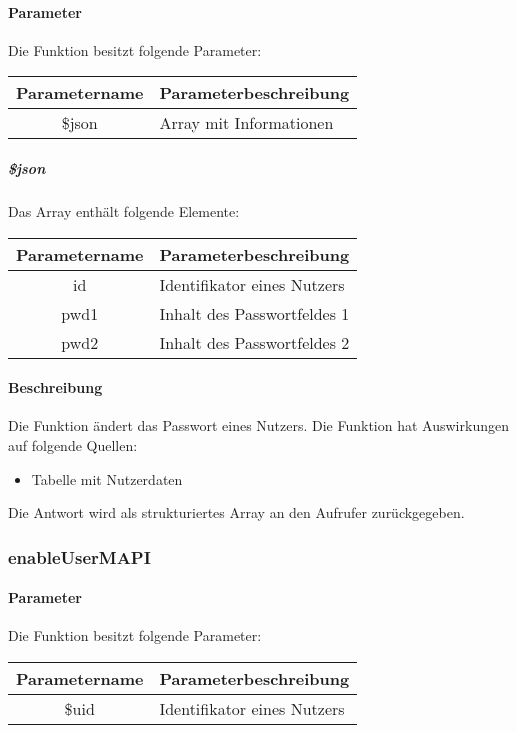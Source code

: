 \paragraph{Parameter} Die Funktion besitzt folgende Parameter:
\begin{table}[H]
	\begin{tabular}{|c|p{11cm}|}
		\hline
		\textbf{Parametername} & \textbf{Parameterbeschreibung} \\ \hline
		\$json & Array mit Informationen \\ \hline
	\end{tabular}
\end{table}
\subparagraph{\$json}Das Array enthält folgende Elemente:
\begin{table}[H]
	\begin{tabular}{|c|p{11cm}|}
		\hline
		\textbf{Parametername} & \textbf{Parameterbeschreibung} \\ \hline
		id   & Identifikator eines Nutzers \\ \hline
		pwd1 & Inhalt des Passwortfeldes 1 \\ \hline
		pwd2 & Inhalt des Passwortfeldes 2 \\ \hline
	\end{tabular}
\end{table}
\paragraph{Beschreibung} Die Funktion ändert das Passwort eines Nutzers. Die Funktion hat Auswirkungen auf folgende Quellen:
\begin{itemize}
	\item Tabelle mit Nutzerdaten
\end{itemize}
Die Antwort wird als strukturiertes Array an den Aufrufer zurückgegeben.
\subsubsection{enableUserMAPI}
\paragraph{Parameter} Die Funktion besitzt folgende Parameter:
\begin{table}[H]
	\begin{tabular}{|c|p{11cm}|}
		\hline
		\textbf{Parametername} & \textbf{Parameterbeschreibung} \\ \hline
		\$uid & Identifikator eines Nutzers \\ \hline
	\end{tabular}
\end{table}
